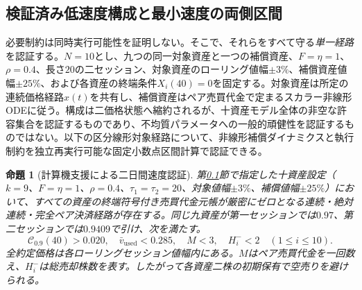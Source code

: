 \documentclass[11pt]{article}
\numberwithin{equation}{section}
\newtheorem{proposition}[theorem]{命題}
\theoremstyle{definition}
\theoremstyle{remark}
\newcommand{\Cris}{\mathcal{C}}
\begin{document}
\subsection{検証済み低速度構成と最小速度の両側区間}\label{subsec:v7-certified}
必要制約は同時実行可能性を証明しない。そこで、それらをすべて守る\emph{単一経路}を認証する。$N=10$とし、九つの同一対象資産と一つの補償資産、$F=\eta=1$、$\rho=0.4$、長さ$20$の二セッション、対象資産のローリング値幅$\pm3\%$、補償資産値幅$\pm25\%$、および各資産の終端条件$X_i(40)=0$を固定する。対象資産は所定の連続価格経路$x(t)$を共有し、補償資産はペア売買代金で定まるスカラー非線形ODEに従う。構成は二価格状態へ縮約されるが、十資産モデル全体の非空な許容集合を認証するものであり、不均質パラメータへの一般的頑健性を認証するものではない。以下の区分線形対象経路について、非線形補償ダイナミクスと執行制約を独立再実行可能な固定小数点区間計算で認証できる。
\begin{proposition}[計算機支援による二日間速度認証]\label{prop:certified-v7}
第\ref{subsec:v7-certified}節で指定した十資産設定（$k=9$、$F=\eta=1$、$\rho=0.4$、$\tau_1=\tau_2=20$、対象値幅$\pm3\%$、補償値幅$\pm25\%$）において、すべての資産の終端符号付き売買代金元帳が厳密にゼロとなる連続・絶対連続・完全ペア決済経路が存在する。同じ九資産が第一セッションでは$0.97$、第二セッションでは$0.9409$で引け、次を満たす。
\begin{equation}\label{eq:v7-certified-result}
\boxed{\Cris_{0.9}(40)>0.020,\quad \bar v_{\mathrm{used}}<0.285,\quad M<3,\quad H_i^-<2\quad(1\le i\le10).}
\end{equation}
全約定価格は各ローリングセッション値幅内にある。$M$はペア売買代金を一回数え、$H_i^-$は総売却株数を表す。したがって各資産二株の初期保有で空売りを避けられる。
\end{proposition}
\end{document}
